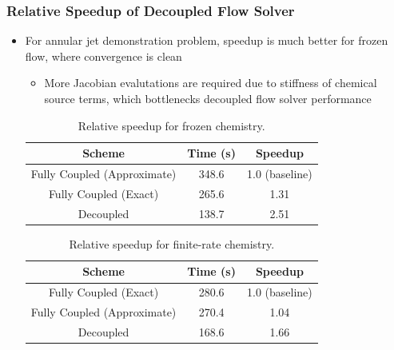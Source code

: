 \documentclass{beamer}
\begin{document}
\begin{frame}
  \frametitle{Relative Speedup of Decoupled Flow Solver}
  \begin{itemize}
    \item For annular jet demonstration problem, speedup is much better for
      frozen flow, where convergence is clean
      \begin{itemize}
        \item More Jacobian evalutations are required due to stiffness of chemical
          source terms, which bottlenecks decoupled flow solver performance
      \end{itemize}
\begin{table}[h]
  \tiny
  \centering
  \begin{tabular}{c|c|c}
    Scheme & Time (s) & Speedup \\
    \hline
    Fully Coupled (Approximate) & 348.6 & 1.0 (baseline) \\
    Fully Coupled (Exact)       & 265.6 & 1.31 \\
    Decoupled                   & 138.7 & 2.51
  \end{tabular}
  \caption{Relative speedup for frozen chemistry.}
  \label{tab:srp-rel-speedup-frozen}
\end{table}
\begin{table}[h]
  \tiny
  \centering
  \begin{tabular}{c|c|c}
    Scheme & Time (s) & Speedup \\
    \hline
    Fully Coupled (Exact)       & 280.6 & 1.0 (baseline) \\
    Fully Coupled (Approximate) & 270.4 & 1.04 \\
    Decoupled                   & 168.6 & 1.66
  \end{tabular}
  \caption{Relative speedup for finite-rate chemistry.}
  \label{tab:srp-rel-speedup-chem}
\end{table}
  \end{itemize}
\end{frame}
\end{document}
